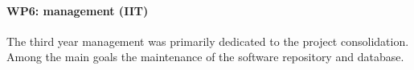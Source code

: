 \paragraph{WP6: management (IIT)}

The third year management was primarily dedicated to the project consolidation. Among the main goals the maintenance of the software repository and database.
